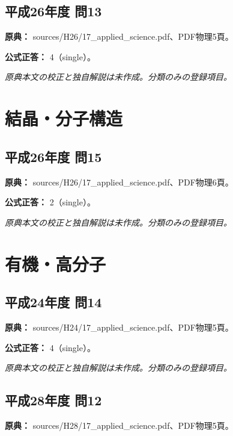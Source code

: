 \subsection{平成26年度 問13}
\label{q:h26-reg-applied-13}

\noindent\textbf{原典：} sources/H26/17\_applied\_science.pdf、PDF物理5頁。

\textbf{公式正答：} 4（single）。

\par\textit{原典本文の校正と独自解説は未作成。分類のみの登録項目。}

\section{結晶・分子構造}

\subsection{平成26年度 問15}
\label{q:h26-reg-applied-15}

\noindent\textbf{原典：} sources/H26/17\_applied\_science.pdf、PDF物理6頁。

\textbf{公式正答：} 2（single）。

\par\textit{原典本文の校正と独自解説は未作成。分類のみの登録項目。}

\section{有機・高分子}

\subsection{平成24年度 問14}
\label{q:h24-reg-applied-14}

\noindent\textbf{原典：} sources/H24/17\_applied\_science.pdf、PDF物理5頁。

\textbf{公式正答：} 4（single）。

\par\textit{原典本文の校正と独自解説は未作成。分類のみの登録項目。}

\subsection{平成28年度 問12}
\label{q:h28-reg-applied-12}

\noindent\textbf{原典：} sources/H28/17\_applied\_science.pdf、PDF物理5頁。

